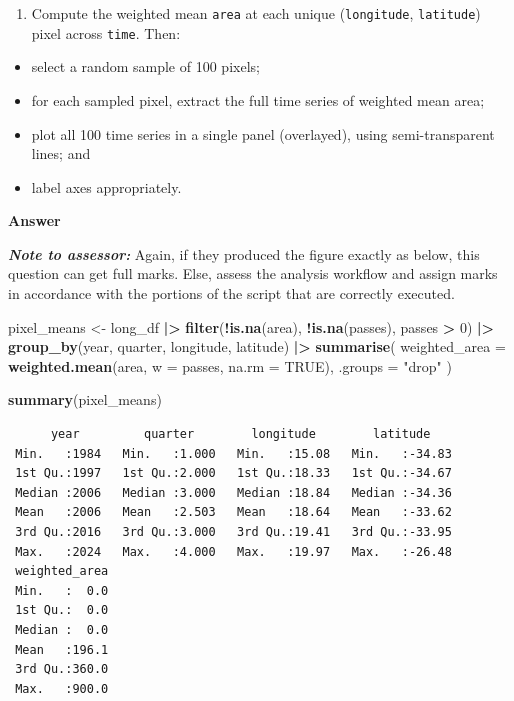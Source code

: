 \documentclass[
  british,
  10pt,
]{article}
\newenvironment{Shaded}{\begin{snugshade}}{\end{snugshade}}
\newcommand{\AttributeTok}[1]{\textcolor[rgb]{0.13,0.29,0.53}{#1}}
\newcommand{\ConstantTok}[1]{\textcolor[rgb]{0.56,0.35,0.01}{#1}}
\newcommand{\DecValTok}[1]{\textcolor[rgb]{0.00,0.00,0.81}{#1}}
\newcommand{\FunctionTok}[1]{\textcolor[rgb]{0.13,0.29,0.53}{\textbf{#1}}}
\newcommand{\NormalTok}[1]{#1}
\newcommand{\OtherTok}[1]{\textcolor[rgb]{0.56,0.35,0.01}{#1}}
\newcommand{\SpecialCharTok}[1]{\textcolor[rgb]{0.81,0.36,0.00}{\textbf{#1}}}
\newcommand{\StringTok}[1]{\textcolor[rgb]{0.31,0.60,0.02}{#1}}
\providecommand{\tightlist}{%
  \setlength{\itemsep}{0pt}\setlength{\parskip}{0pt}}
\let\oldtexttt\texttt
\renewcommand{\texttt}[1]{\oldtexttt{\small #1}}
\begin{document}
\begin{enumerate}
\def\labelenumi{\arabic{enumi}.}
\setcounter{enumi}{1}
\tightlist
\item
  Compute the weighted mean \texttt{area} at each unique
  (\texttt{longitude}, \texttt{latitude}) pixel across \texttt{time}.
  Then:
\end{enumerate}

\begin{itemize}
\tightlist
\item
  select a random sample of 100 pixels;
\item
  for each sampled pixel, extract the full time series of weighted mean
  area;
\item
  plot all 100 time series in a single panel (overlayed), using
  semi-transparent lines; and
\item
  label axes appropriately.
\end{itemize}

\textbf{Answer}

\textbf{\emph{Note to assessor:}} Again, if they produced the figure
exactly as below, this question can get full marks. Else, assess the
analysis workflow and assign marks in accordance with the portions of
the script that are correctly executed.

\begin{Shaded}
\begin{Highlighting}[]
\NormalTok{pixel\_means }\OtherTok{\textless{}{-}}\NormalTok{ long\_df }\SpecialCharTok{|\textgreater{}} 
  \FunctionTok{filter}\NormalTok{(}\SpecialCharTok{!}\FunctionTok{is.na}\NormalTok{(area), }\SpecialCharTok{!}\FunctionTok{is.na}\NormalTok{(passes), passes }\SpecialCharTok{\textgreater{}} \DecValTok{0}\NormalTok{) }\SpecialCharTok{|\textgreater{}} 
  \FunctionTok{group\_by}\NormalTok{(year, quarter, longitude, latitude) }\SpecialCharTok{|\textgreater{}} 
  \FunctionTok{summarise}\NormalTok{(}
    \AttributeTok{weighted\_area =} \FunctionTok{weighted.mean}\NormalTok{(area, }\AttributeTok{w =}\NormalTok{ passes, }\AttributeTok{na.rm =} \ConstantTok{TRUE}\NormalTok{),}
    \AttributeTok{.groups =} \StringTok{"drop"}
\NormalTok{  )}

\FunctionTok{summary}\NormalTok{(pixel\_means)}
\end{Highlighting}
\end{Shaded}

\begin{verbatim}
      year         quarter        longitude        latitude     
 Min.   :1984   Min.   :1.000   Min.   :15.08   Min.   :-34.83  
 1st Qu.:1997   1st Qu.:2.000   1st Qu.:18.33   1st Qu.:-34.67  
 Median :2006   Median :3.000   Median :18.84   Median :-34.36  
 Mean   :2006   Mean   :2.503   Mean   :18.64   Mean   :-33.62  
 3rd Qu.:2016   3rd Qu.:3.000   3rd Qu.:19.41   3rd Qu.:-33.95  
 Max.   :2024   Max.   :4.000   Max.   :19.97   Max.   :-26.48  
 weighted_area  
 Min.   :  0.0  
 1st Qu.:  0.0  
 Median :  0.0  
 Mean   :196.1  
 3rd Qu.:360.0  
 Max.   :900.0  
\end{verbatim}
\end{document}
